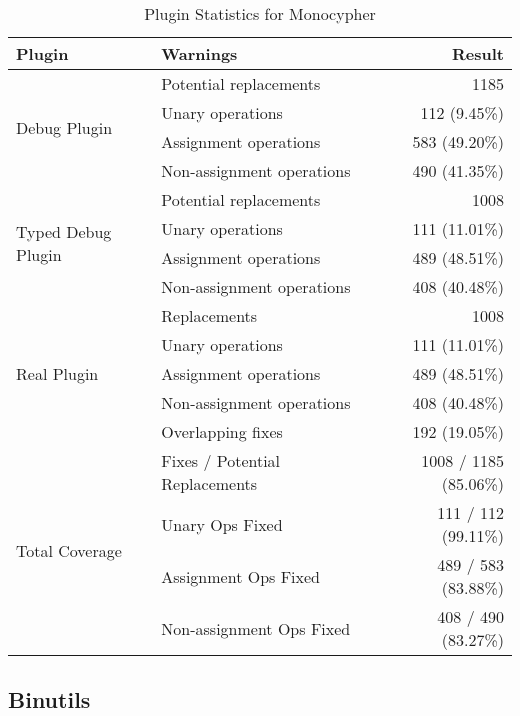 \begin{table}[ht]
\centering
\caption{Plugin Statistics for Monocypher}
\label{tab:mono}
\begin{tabular}{@{}llr@{}}
\toprule
\textbf{Plugin} & \textbf{Warnings} & \textbf{Result} \\
\midrule

\multirow{4}{*}{Debug Plugin} 
  & Potential replacements         & 1185 \\
  & Unary operations               & 112 (9.45\%) \\
  & Assignment operations          & 583 (49.20\%) \\
  & Non-assignment operations      & 490 (41.35\%) \\
\midrule

\multirow{4}{*}{Typed Debug Plugin} 
  & Potential replacements         & 1008 \\
  & Unary operations               & 111 (11.01\%) \\
  & Assignment operations          & 489 (48.51\%) \\
  & Non-assignment operations      & 408 (40.48\%) \\
\midrule

\multirow{5}{*}{Real Plugin} 
  & Replacements                   & 1008 \\
  & Unary operations               & 111 (11.01\%) \\
  & Assignment operations          & 489 (48.51\%) \\
  & Non-assignment operations      & 408 (40.48\%) \\
  & Overlapping fixes              & 192 (19.05\%) \\
\midrule\midrule

\multirow{4}{*}{Total Coverage} 
  & Fixes / Potential Replacements & 1008 / 1185 (85.06\%) \\
  & Unary Ops Fixed                & 111 / 112 (99.11\%) \\
  & Assignment Ops Fixed           & 489 / 583 (83.88\%) \\
  & Non-assignment Ops Fixed       & 408 / 490 (83.27\%) \\
\bottomrule
\end{tabular}
\end{table}

\subsection{Binutils}

